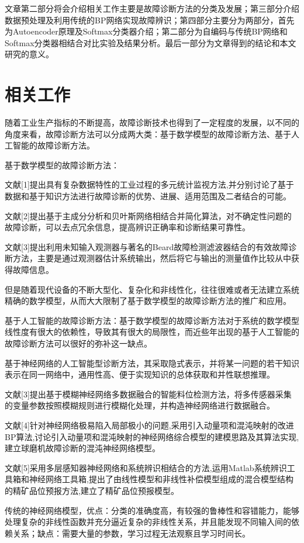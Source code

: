 \documentclass{ctacn}%
\begin{document}
\begin{multicols}{2}
文章第二部分将会介绍相关工作主要是故障诊断方法的分类及发展；第三部分介绍数据预处理及利用传统的BP网络实现故障辨识；第四部分主要分为两部分，首先为Autoencoder原理及Softmax分类器介绍；第二部分为自编码与传统BP网络和Softmax分类器相结合对比实验及结果分析。最后一部分为文章得到的结论和本文研究的意义。

\section{相关工作}
随着工业生产指标的不断提高，故障诊断技术也得到了一定程度的发展，以不同的角度来看，故障诊断方法可以分成两大类：基于数学模型的故障诊断方法、基于人工智能的故障诊断方法。

基于数学模型的故障诊断方法：

文献[1]提出具有复杂数据特性的工业过程的多元统计监视方法,并分别讨论了基于数据和基于知识方法进行故障诊断的优势、进展、适用范围及二者结合的可能。

文献[2]提出基于主成分分析和贝叶斯网络相结合并简化算法，对不确定性问题的故障诊断，可以去点冗余信息，提高辨识正确率和诊断结果可靠性。

文献[3]提出利用未知输入观测器与著名的Beard故障检测滤波器结合的有效故障诊断方法，主要是通过观测器估计系统输出，然后将它与输出的测量值作比较从中获得故障信息。

但是随着现代设备的不断大型化、复杂化和非线性化，往往很难或者无法建立系统精确的数学模型，从而大大限制了基于数学模型的故障诊断方法的推广和应用。

基于人工智能的故障诊断方法：基于数学模型的故障诊断方法对于系统的数学模型线性度有很大的依赖性，导致其有很大的局限性，而近些年出现的基于人工智能的故障诊断方法可以很好的弥补这一缺点。

基于神经网络的人工智能型诊断方法，其采取隐式表示，并将某一问题的若干知识表示在同一网络中，通用性高、便于实现知识的总体获取和并性联想推理。

文献[3]提出基于模糊神经网络多数据融合的智能料位检测方法，将多传感器采集的变量参数按照模糊规则进行模糊化处理，并构造神经网络进行数据融合。

文献[4]针对神经网络极易陷入局部极小的问题,采用引入动量项和混沌映射的改进BP算法,讨论引入动量项和混沌映射的神经网络综合模型的建模思路及其算法实现,建立球磨机故障诊断的混沌神经网络模型。

文献[5]采用多层感知器神经网络和系统辨识相结合的方法,运用Matlab系统辨识工具箱和神经网络工具箱,提出了由线性模型和非线性补偿模型组成的混合模型结构的精矿品位预报方法,建立了精矿品位预报模型。

传统的神经网络模型，优点：分类的准确度高，有较强的鲁棒性和容错能力，能够处理复杂的非线性函数并充分逼近复杂的非线性关系，并且能发现不同输入间的依赖关系；缺点：需要大量的参数，学习过程无法观察且学习时间长。


\end{multicols}
\end{document}
